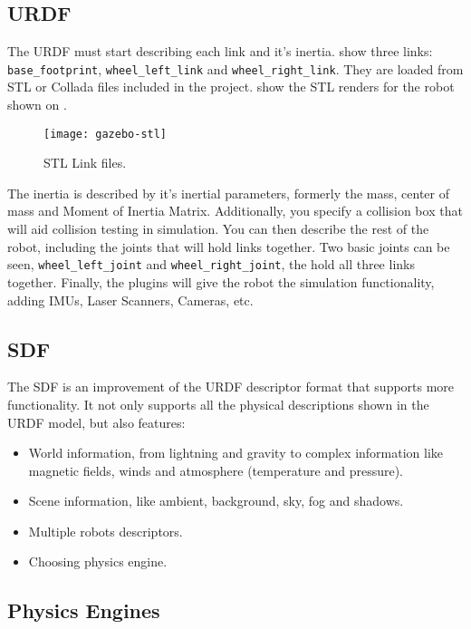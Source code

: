 \subsection{URDF}

The URDF must start describing each link and it's inertia.   show three links: \texttt{base\_footprint}, \texttt{wheel\_left\_link} and \texttt{wheel\_right\_link}. They are loaded from STL or Collada files included in the project.  show the STL renders for the robot shown on .

\begin{figure}[!ht]
\centering
\texttt{[image: gazebo-stl]}
\caption{STL Link files.}
\label{fig:gazebo-stl}
\end{figure}

The inertia is described by it's inertial parameters, formerly the mass, center of mass and Moment of Inertia Matrix. Additionally, you specify a collision box that will aid collision testing in simulation. You can then describe the rest of the robot, including the joints that will hold links together. Two basic joints can be seen, \texttt{wheel\_left\_joint} and \texttt{wheel\_right\_joint}, the hold all three links together. Finally, the plugins will give the robot the simulation functionality, adding IMUs, Laser Scanners, Cameras, etc.

\subsection{SDF}

The SDF is an improvement of the URDF descriptor format that supports more functionality. It not only supports all the physical descriptions shown in the URDF model, but also features:

\begin{itemize}
\item World information, from lightning and gravity to complex information like magnetic fields, winds and atmosphere (temperature and pressure).
\item Scene information, like ambient, background, sky, fog and shadows.
\item Multiple robots descriptors.
\item Choosing physics engine.
\end{itemize}

\subsection{Physics Engines}

